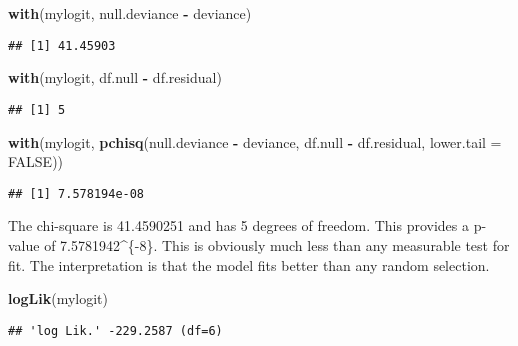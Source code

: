 \documentclass[]{article}
\newenvironment{Shaded}{\begin{snugshade}}{\end{snugshade}}
\newcommand{\KeywordTok}[1]{\textcolor[rgb]{0.13,0.29,0.53}{\textbf{#1}}}
\newcommand{\DataTypeTok}[1]{\textcolor[rgb]{0.13,0.29,0.53}{#1}}
\newcommand{\StringTok}[1]{\textcolor[rgb]{0.31,0.60,0.02}{#1}}
\newcommand{\OtherTok}[1]{\textcolor[rgb]{0.56,0.35,0.01}{#1}}
\newcommand{\OperatorTok}[1]{\textcolor[rgb]{0.81,0.36,0.00}{\textbf{#1}}}
\newcommand{\NormalTok}[1]{#1}
\begin{document}
\begin{Shaded}
\begin{Highlighting}[]
\KeywordTok{with}\NormalTok{(mylogit, null.deviance }\OperatorTok{-}\StringTok{ }\NormalTok{deviance)}
\end{Highlighting}
\end{Shaded}

\begin{verbatim}
## [1] 41.45903
\end{verbatim}

\begin{Shaded}
\begin{Highlighting}[]
\KeywordTok{with}\NormalTok{(mylogit, df.null }\OperatorTok{-}\StringTok{ }\NormalTok{df.residual)}
\end{Highlighting}
\end{Shaded}

\begin{verbatim}
## [1] 5
\end{verbatim}

\begin{Shaded}
\begin{Highlighting}[]
\KeywordTok{with}\NormalTok{(mylogit, }\KeywordTok{pchisq}\NormalTok{(null.deviance }\OperatorTok{-}\StringTok{ }\NormalTok{deviance, df.null }\OperatorTok{-}\StringTok{ }\NormalTok{df.residual, }\DataTypeTok{lower.tail =} \OtherTok{FALSE}\NormalTok{))}
\end{Highlighting}
\end{Shaded}

\begin{verbatim}
## [1] 7.578194e-08
\end{verbatim}

The chi-square is 41.4590251 and has 5 degrees of freedom. This provides
a p-value of 7.5781942\^{}\{-8\}. This is obviously much less
than any measurable test for fit. The interpretation is that the model
fits better than any random selection.

\begin{Shaded}
\begin{Highlighting}[]
\KeywordTok{logLik}\NormalTok{(mylogit)}
\end{Highlighting}
\end{Shaded}

\begin{verbatim}
## 'log Lik.' -229.2587 (df=6)
\end{verbatim}
\end{document}
